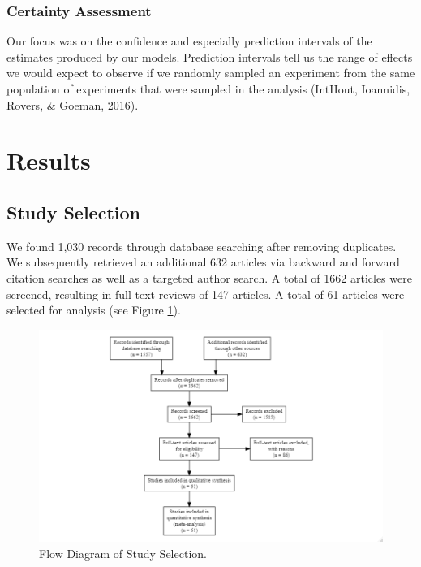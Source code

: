 \documentclass[
  english,
  man,mask,floatsintext]{apa7}
\begin{document}
\hypertarget{certainty-assessment}{%
\subsubsection{Certainty Assessment}\label{certainty-assessment}}

Our focus was on the confidence and especially prediction intervals of the estimates produced by our models. Prediction intervals tell us the range of effects we would expect to observe if we randomly sampled an experiment from the same population of experiments that were sampled in the analysis (IntHout, Ioannidis, Rovers, \& Goeman, 2016).

\hypertarget{results}{%
\section{Results}\label{results}}

\hypertarget{study-selection}{%
\subsection{Study Selection}\label{study-selection}}

We found 1,030 records through database searching after removing duplicates. We subsequently retrieved an additional 632 articles via backward and forward citation searches as well as a targeted author search. A total of 1662 articles were screened, resulting in full-text reviews of 147 articles. A total of 61 articles were selected for analysis (see Figure \ref{fig:fig1}).



\begin{figure}

{\centering \includegraphics[width=1.25\linewidth,height=1.5\textheight]{../../figures/fig1} 

}

\caption{Flow Diagram of Study Selection.}\label{fig:fig1}
\end{figure}
\end{document}
